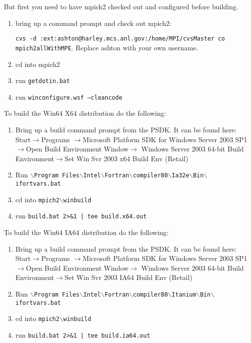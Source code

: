 \documentclass[dvipdfm,11pt]{article}
\begin{document}
But first you need to have mpich2 checked out and configured before building.
\begin{enumerate}
\item bring up a command prompt and check out mpich2: 

\texttt{cvs -d :ext:ashton@harley.mcs.anl.gov:/home/MPI/cvsMaster co mpich2allWithMPE}.  Replace ashton with your own username.
\item cd into mpich2
\item run \texttt{getdotin.bat}
\item run \texttt{winconfigure.wsf --cleancode}
\end{enumerate}

To build the Win64 X64 distribution do the following:
\begin{enumerate}
\item Bring up a build command prompt from the PSDK.  It can be found here: Start$\to$Programs
$\to$Microsoft Platform SDK for Windows Server 2003 SP1$\to$Open Build Environment Window$\to$
Windows Server 2003 64-bit Build Environment$\to$Set Win Svr 2003 x64 Build Env (Retail)
\item Run \texttt{$\backslash$Program Files$\backslash$Intel$\backslash$Fortran$\backslash$compiler80$\backslash$Ia32e$\backslash$Bin$\backslash$ifortvars.bat}
\item cd into \texttt{mpich2$\backslash$winbuild}
\item run \texttt{build.bat 2>\&1 | tee build.x64.out}
\end{enumerate}

To build the Win64 IA64 distribution do the following:
\begin{enumerate}
\item Bring up a build command prompt from the PSDK.  It can be found here: Start$\to$Programs
$\to$Microsoft Platform SDK for Windows Server 2003 SP1$\to$Open Build Environment Window$\to$
Windows Server 2003 64-bit Build Environment$\to$Set Win Svr 2003 IA64 Build Env (Retail)
\item Run \texttt{$\backslash$Program Files$\backslash$Intel$\backslash$Fortran$\backslash$compiler80$\backslash$Itanium$\backslash$Bin$\backslash$ifortvars.bat}
\item cd into \texttt{mpich2$\backslash$winbuild}
\item run \texttt{build.bat 2>\&1 | tee build.ia64.out}
\end{enumerate}
\end{document}
